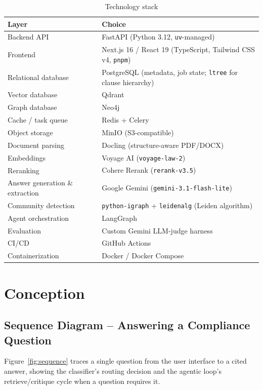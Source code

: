 \documentclass[12pt,a4paper]{report}
\begin{document}
\begin{table}[H]
\centering
\caption{Technology stack}
\label{tab:techstack}
\begin{tabularx}{\textwidth}{@{}l X@{}}
\toprule
\textbf{Layer} & \textbf{Choice} \\
\midrule
Backend \ac{API} & FastAPI (Python 3.12, \texttt{uv}-managed) \\
Frontend & Next.js 16 / React 19 (TypeScript, Tailwind CSS v4, \texttt{pnpm}) \\
Relational database & PostgreSQL (metadata, job state; \texttt{ltree} for clause hierarchy) \\
Vector database & Qdrant \\
Graph database & Neo4j \\
Cache / task queue & Redis + Celery \\
Object storage & MinIO (S3-compatible) \\
Document parsing & Docling (structure-aware \ac{PDF}/DOCX) \\
Embeddings & Voyage AI (\texttt{voyage-law-2}) \\
Reranking & Cohere Rerank (\texttt{rerank-v3.5}) \\
Answer generation \& extraction & Google Gemini (\texttt{gemini-3.1-flash-lite}) \\
Community detection & \texttt{python-igraph} + \texttt{leidenalg} (Leiden algorithm) \\
Agent orchestration & LangGraph \\
Evaluation & Custom Gemini LLM-judge harness \\
\ac{CI/CD} & GitHub Actions \\
Containerization & Docker / Docker Compose \\
\bottomrule
\end{tabularx}
\end{table}

\section{Conception}

\subsection{Sequence Diagram -- Answering a Compliance Question}

Figure~\ref{fig:sequence} traces a single question from the user interface
to a cited answer, showing the classifier's routing decision and the
agentic loop's retrieve/critique cycle when a question requires it.
\end{document}
